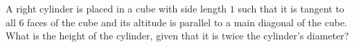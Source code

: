 A right cylinder is placed in a cube with side length $1$ such that it is tangent to all $6$ faces of the cube and its altitude is parallel to a main diagonal of the cube. What is the height of the cylinder, given that it is twice the cylinder's diameter?
